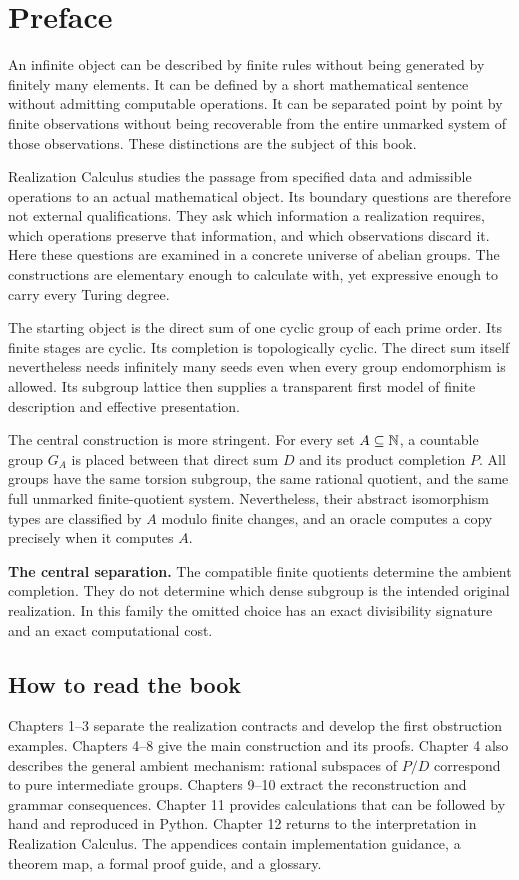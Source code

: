\chapter*{Preface}
An infinite object can be described by finite rules without being generated by finitely many elements. It can be defined by a short mathematical sentence without admitting computable operations. It can be separated point by point by finite observations without being recoverable from the entire unmarked system of those observations. These distinctions are the subject of this book.

Realization Calculus studies the passage from specified data and admissible operations to an actual mathematical object. Its boundary questions are therefore not external qualifications. They ask which information a realization requires, which operations preserve that information, and which observations discard it. Here these questions are examined in a concrete universe of abelian groups. The constructions are elementary enough to calculate with, yet expressive enough to carry every Turing degree.

The starting object is the direct sum of one cyclic group of each prime order. Its finite stages are cyclic. Its completion is topologically cyclic. The direct sum itself nevertheless needs infinitely many seeds even when every group endomorphism is allowed. Its subgroup lattice then supplies a transparent first model of finite description and effective presentation.

The central construction is more stringent. For every set $A\subseteq\mathbb N$, a countable group $G_A$ is placed between that direct sum $D$ and its product completion $P$. All groups have the same torsion subgroup, the same rational quotient, and the same full unmarked finite-quotient system. Nevertheless, their abstract isomorphism types are classified by $A$ modulo finite changes, and an oracle computes a copy precisely when it computes $A$.

\begin{keybox}
\textbf{The central separation.} The compatible finite quotients determine the ambient completion. They do not determine which dense subgroup is the intended original realization. In this family the omitted choice has an exact divisibility signature and an exact computational cost.
\end{keybox}

\section*{How to read the book}
Chapters 1--3 separate the realization contracts and develop the first obstruction examples. Chapters 4--8 give the main construction and its proofs. Chapter 4 also describes the general ambient mechanism: rational subspaces of $P/D$ correspond to pure intermediate groups. Chapters 9--10 extract the reconstruction and grammar consequences. Chapter 11 provides calculations that can be followed by hand and reproduced in Python. Chapter 12 returns to the interpretation in Realization Calculus. The appendices contain implementation guidance, a theorem map, a formal proof guide, and a glossary.

